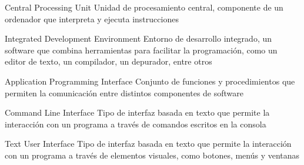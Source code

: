 {Central Processing Unit}
{Unidad de procesamiento central, componente de un ordenador que interpreta y ejecuta instrucciones}


{Integrated Development Environment}
{Entorno de desarrollo integrado, un software que combina herramientas para facilitar la programación, como un editor de texto, un compilador, un depurador, entre otros}

{Application Programming Interface}
{Conjunto de funciones y procedimientos que permiten la comunicación entre distintos componentes de software}


{Command Line Interface}
{Tipo de interfaz basada en texto que permite la interacción con un programa a través de comandos escritos en la consola}

{Text User Interface}
{Tipo de interfaz basada en texto que permite la interacción con un programa a través de elementos visuales, como botones, menús y ventanas}


